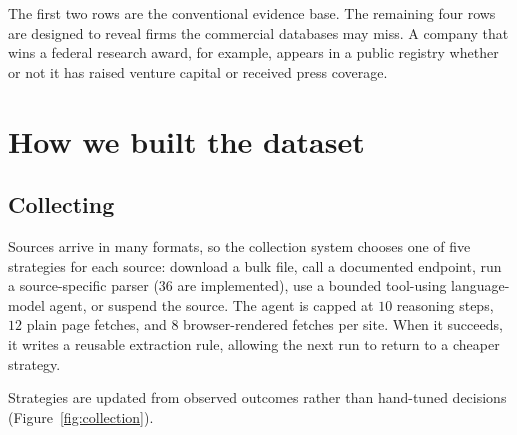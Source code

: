 \documentclass[11pt]{article}
\begin{document}
The first two rows are the conventional evidence base. The remaining four rows
are designed to reveal firms the commercial databases may miss. A company that
wins a federal research award, for example, appears in a public registry
whether or not it has raised venture capital or received press coverage.

\section{How we built the dataset}

\subsection{Collecting}

Sources arrive in many formats, so the collection system chooses one of five
strategies for each source: download a bulk file, call a documented endpoint,
run a source-specific parser ($36$ are implemented), use a bounded
tool-using language-model agent, or suspend the source. The agent is capped at
$10$ reasoning steps, $12$ plain page fetches, and $8$ browser-rendered fetches
per site. When it succeeds, it writes a reusable extraction rule, allowing the
next run to return to a cheaper strategy.

Strategies are updated from observed outcomes rather than hand-tuned decisions
(Figure~\ref{fig:collection}).
\end{document}

